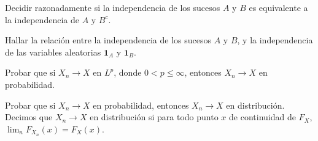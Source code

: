 \begin{problem}[2] Decidir razonadamente si la independencia de los sucesos $A$ y $B$ es equivalente a la independencia de $A$ y $B^c$.
\solution

\begin{expla}

\end{expla}

\end{problem}


\begin{problem}[3] Hallar la relaci\'on entre la independencia de los sucesos $A$ y $B$, y la independencia de las variables aleatorias $\mathbf{1}_A$ y $\mathbf{1}_B$.
\solution

\begin{expla}

\end{expla}

\end{problem}


\begin{problem}[4] Probar que si $X_n\to  X$ en $L^p$, donde  $0 < p \le \infty$, entonces $X_n\to  X$ en probabilidad.
\solution

\begin{expla}

\end{expla}

\end{problem}


\begin{problem}[5] Probar que si $X_n\to  X$ en  probabilidad, entonces $X_n\to  X$ en distribuci\'on. Decimos que
 $X_n\to  X$ en distribuci\'on si para todo punto $x$ de continuidad de $F_X$, $\lim_n F_{X_n} (x) = F_X (x)$.
\solution

\begin{expla}

\end{expla}

\end{problem}

